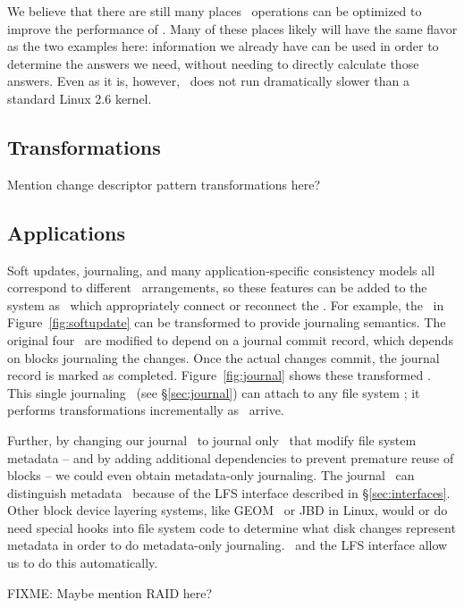 We believe that there are still many places \chdesc\ operations can be
optimized to improve the performance of \Kudos. Many of these places likely
will have the same flavor as the two examples here: information we already have
can be used in order to determine the answers we need, without needing to
directly calculate those answers. Even as it is, however, \Kudos\ does not run
dramatically slower than a standard Linux 2.6 kernel.

\subsection {Transformations}
Mention change descriptor pattern transformations here?

\subsection {Applications}
Soft updates, journaling, and many application-specific consistency models all
correspond to different \chdesc\ arrangements, so these features can be added
to the system as \modules\ which appropriately connect or reconnect the
\chdescs. For example, the \chdescs\ in Figure~\ref{fig:softupdate} can be
transformed to provide journaling semantics. The original four \chdescs\ are
modified to depend on a journal commit record, which depends on blocks
journaling the changes. Once the actual changes commit, the journal record is
marked as completed. Figure~\ref{fig:journal} shows these transformed \chdescs.
This single journaling \module\ (see \S\ref{sec:journal}) can attach to any
file system \module; it performs transformations incrementally as \chdescs\
arrive.

Further, by changing our journal \module\ to journal only \chdescs\ that modify
file system metadata -- and by adding additional dependencies to prevent
premature reuse of blocks -- we could even obtain metadata-only journaling. The
journal \module\ can distinguish metadata \chdescs\ because of the LFS
interface described in \S\ref{sec:interfaces}. Other block device layering
systems, like GEOM~\cite{geom} or JBD in Linux, would or do need special hooks
into file system code to determine what disk changes represent metadata in
order to do metadata-only journaling. \Chdescs\ and the LFS interface allow us
to do this automatically.

FIXME: Maybe mention RAID here?
